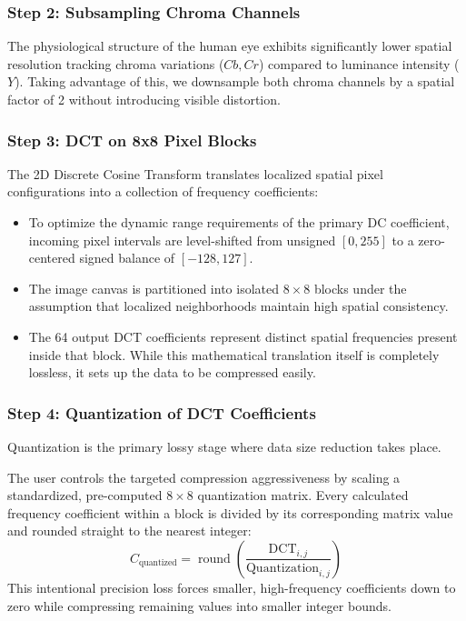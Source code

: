 \documentclass{article}
\begin{document}
\subsubsection{Step 2: Subsampling Chroma Channels}
The physiological structure of the human eye exhibits significantly lower spatial resolution tracking chroma variations ($Cb, Cr$) compared to luminance intensity ($Y$). Taking advantage of this, we downsample both chroma channels by a spatial factor of 2 without introducing visible distortion.

\subsubsection{Step 3: DCT on 8x8 Pixel Blocks}
The 2D Discrete Cosine Transform translates localized spatial pixel configurations into a collection of frequency coefficients:
\begin{itemize}
  \item To optimize the dynamic range requirements of the primary DC coefficient, incoming pixel intervals are level-shifted from unsigned $[0, 255]$ to a zero-centered signed balance of $[-128, 127]$.
  \item The image canvas is partitioned into isolated $8\times8$ blocks under the assumption that localized neighborhoods maintain high spatial consistency.
  \item The 64 output DCT coefficients represent distinct spatial frequencies present inside that block. While this mathematical translation itself is completely lossless, it sets up the data to be compressed easily.
\end{itemize}

\subsubsection{Step 4: Quantization of DCT Coefficients}
Quantization is the primary lossy stage where data size reduction takes place. 

The user controls the targeted compression aggressiveness by scaling a standardized, pre-computed $8\times8$ quantization matrix. Every calculated frequency coefficient within a block is divided by its corresponding matrix value and rounded straight to the nearest integer:
\[
C_{\text{quantized}} = \operatorname{round}\left( \frac{\text{DCT}_{i,j}}{\text{Quantization}_{i,j}} \right)
\]
This intentional precision loss forces smaller, high-frequency coefficients down to zero while compressing remaining values into smaller integer bounds.
\end{document}
